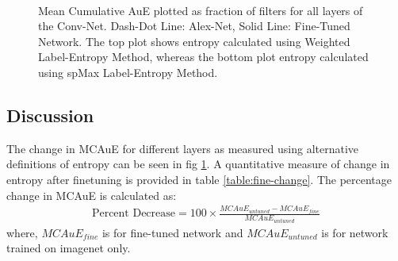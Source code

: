 \documentclass[runningheads]{llncs}
\begin{document}
\begin{figure}
\centering
{} \\
\caption{Mean Cumulative AuE plotted as fraction of filters for all layers of the Conv-Net. Dash-Dot Line: Alex-Net, Solid Line: Fine-Tuned Network. The top plot shows entropy calculated using Weighted Label-Entropy Method, whereas the bottom plot entropy calculated using spMax Label-Entropy Method.}
\label{fig:fine-entropy}
\end{figure}

\subsection{Discussion}
The change in MCAuE for different layers as measured using alternative definitions of entropy can be seen in fig \ref{fig:fine-entropy}. A quantitative measure of change in entropy after finetuning is provided in table \ref{table:fine-change}. The percentage change in MCAuE is calculated as:
\begin{eqnarray}
\text{Percent Decrease} = 100 \times \frac{MCAuE_{untuned} - MCAuE_{fine}}{MCAuE_{untuned}}
\end{eqnarray}
where, $MCAuE_{fine}$ is for fine-tuned network and $MCAuE_{untuned}$ is for network trained on imagenet only.
\end{document}
